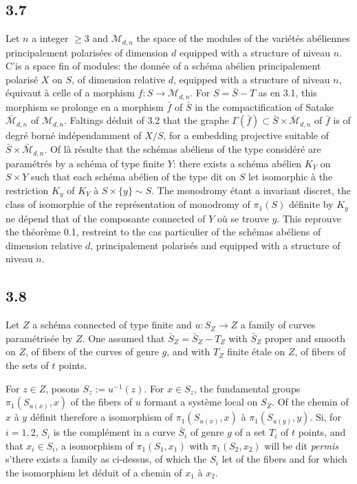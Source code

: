 \documentclass[12pt,a4paper]{article}
\theoremstyle{plain}
\theoremstyle{definition}
\begin{document}
{\subsection*{3.7}
Let $n$ a integer $\geq 3$ and $\mathcal{M}_{d,n}$ the space of the modules of the vari\'{e}t\'{e}s ab\'{e}liennes principalement polaris\'{e}es of dimension $d$ equipped with a structure of niveau $n$. C'is a space fin of modules: the donn\'{e}e of a sch\'{e}ma ab\'{e}lien principalement polaris\'{e} $X$ on $S$, of dimension relative $d$, equipped with a structure of niveau $n$, \'{e}quivaut \`{a} celle of a morphism $f : S \to \mathcal{M}_{d,n}$. For $S = \bar{S} - T$ as en 3.1, this morphism se prolonge en a morphism $\bar{f}$ of $\bar{S}$ in the compactification of Satake $\bar{\mathcal{M}}_{d,n}$ of $\mathcal{M}_{d,n}$. Faltings d\'{e}duit of 3.2 that the graphe $\Gamma(\bar{f}) \subset \bar{S} \times \bar{\mathcal{M}}_{d,n}$ of $\bar{f}$ is of degr\'{e} born\'{e} ind\'{e}pendamment of $X/S$, for a embedding projective suitable of $\bar{S} \times \bar{\mathcal{M}}_{d,n}$. Of l\`{a} r\'{e}sulte that the sch\'{e}mas ab\'{e}liens of the type consid\'{e}r\'{e} are param\'{e}tr\'{e}s by a sch\'{e}ma of type finite $Y$: there exists a sch\'{e}ma ab\'{e}lien $K_{Y}$ on $S \times Y$ such that each sch\'{e}ma ab\'{e}lien of the type dit on $S$ let isomorphic \`{a} the restriction $K_{y}$ of $K_{Y}$ \`{a} $S \times \{y\} \sim S$. The monodromy \'{e}tant a invariant discret, the class of isomorphie of the repr\'{e}sentation of monodromy of $\pi_{1}(S)$ d\'{e}finite by $K_{y}$ ne d\'{e}pend that of the composante connected of $Y$ o\`{u} se trouve $y$. This reprouve the th\'{e}or\`{e}me 0.1, restreint to the cas particulier of the sch\'{e}mas ab\'{e}liens of dimension relative $d$, principalement polaris\'{e}s and equipped with a structure of niveau $n$.

\subsection*{3.8}
Let $Z$ a sch\'{e}ma connected of type finite and $u : S_{Z} \to Z$ a family of curves param\'{e}tris\'{e}e by $Z$. One assumed that $\bar{S}_{Z} = \bar{S}_{Z} - T_{Z}$ with $\bar{S}_{Z}$ proper and smooth on $Z$, of fibers of the curves of genre $g$, and with $T_{Z}$ finite \'{e}tale on $Z$, of fibers of the sets of $t$ points.

For $z \in Z$, posons $S_{z} := u^{-1}(z)$. For $x \in S_{z}$, the fundamental groups $\pi_{1}(S_{u(x)}, x)$ of the fibers of $u$ formant a syst\`{e}me local on $S_{Z}$. Of the chemin of $x$ \`{a} $y$ d\'{e}finit therefore a isomorphism of $\pi_{1}(S_{u(x)}, x)$ \`{a} $\pi_{1}(S_{u(y)}, y)$. Si, for $i = 1, 2$, $S_{i}$ is the compl\'{e}ment in a curve $\bar{S}_{i}$ of genre $g$ of a set $T_{i}$ of $t$ points, and that $x_{i} \in S_{i}$, a isomorphism of $\pi_{1}(S_{1}, x_{1})$ with $\pi_{1}(S_{2}, x_{2})$ will be dit \emph{permis} s'there exists a family as ci-dessus, of which the $S_{i}$ let of the fibers and for which the isomorphism let d\'{e}duit of a chemin of $x_{1}$ \`{a} $x_{2}$.

}
\end{document}
